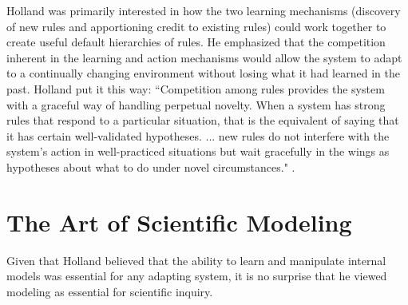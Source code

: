 \documentclass{sig-alternate}
\begin{document}

Holland was primarily interested in how the two
learning mechanisms (discovery of new rules and apportioning credit to
existing rules) could work together to create 
useful default hierarchies of rules.  He emphasized that the competition inherent in the learning
and action mechanisms would allow the system to adapt to a continually
changing environment without losing what it had learned in the past.
Holland put it this way: ``Competition among rules provides the system
with a graceful way of handling perpetual novelty.  When a system has
strong rules that respond to a particular situation, that is the
equivalent of saying that it has certain well-validated hypotheses.
... new rules do not interfere with the system's action in well-practiced
situations but wait gracefully in the wings as hypotheses about what
to do under novel circumstances." \cite{Holland1992}.  

\section{The Art of Scientific Modeling}

Given that Holland believed that the ability to learn and manipulate
internal models was essential for any adapting system, it is no
surprise that he viewed modeling as essential for scientific inquiry.

\end{document}
